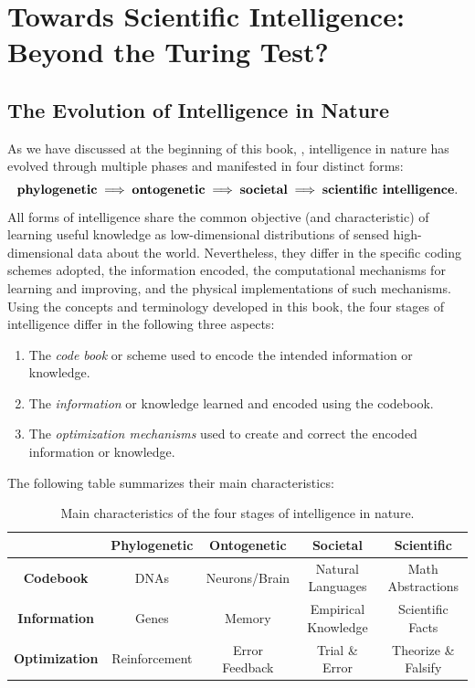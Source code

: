 \documentclass[../../book-main.tex]{subfiles}
\begin{document}
\section{Towards Scientific Intelligence: Beyond the Turing Test?}

\subsection{The Evolution of Intelligence in Nature}
As we have discussed at the beginning of this book, , intelligence in nature has evolved through multiple phases and manifested in four distinct forms:
\begin{equation}
    \text{\textbf{phylogenetic}} \;
    \Longrightarrow \; \text{\textbf{ontogenetic}} \; 
    \Longrightarrow \; \text{\textbf{societal}} \; 
    \Longrightarrow \; \text{\textbf{scientific intelligence}}.
\end{equation}
All forms of intelligence share the common objective (and characteristic) of learning useful knowledge as low-dimensional distributions of sensed high-dimensional data about the world. Nevertheless, they differ in the specific coding schemes adopted, the information encoded, the computational mechanisms for learning and improving, and the physical implementations of such mechanisms. Using the concepts and terminology developed in this book, the four stages of intelligence differ in the following three aspects:
\begin{enumerate}
    \item The \textit{code book} or scheme used to encode the intended information or knowledge.
    \item The \textit{information} or knowledge learned and encoded using the codebook. 
    \item The \textit{optimization mechanisms} used to create and correct the encoded information or knowledge.
\end{enumerate}
The following table summarizes their main characteristics:
\begin{table}[h]
    \centering
    \begin{tabular}{| c | c | c | c | c |}
    \hline & \textbf{Phylogenetic} & \textbf{Ontogenetic} & \textbf{Societal} & \textbf{Scientific}\\
    \hline
    
    \textbf{Codebook}  & DNAs & Neurons/Brain & Natural Languages & Math  Abstractions \\ [0.5ex]
    \hline 
    
    \textbf{Information} & Genes & Memory & Empirical Knowledge & Scientific Facts\\ [0.5ex]
    \hline
    \textbf{Optimization} & Reinforcement & Error Feedback & Trial \& Error & Theorize \& Falsify \\  [0.5ex]
    \hline
    \end{tabular}
    \caption{Main characteristics of the four stages of intelligence in nature.}    
\end{table}
\end{document}
